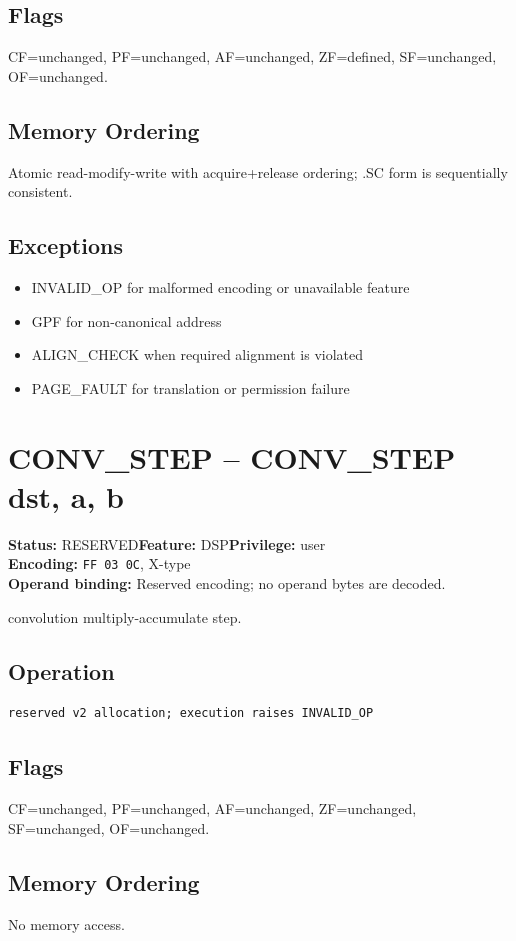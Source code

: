 \documentclass[10pt]{article}
\begin{document}
\subsection*{Flags}
CF=unchanged, PF=unchanged, AF=unchanged, ZF=defined, SF=unchanged, OF=unchanged.
\subsection*{Memory Ordering}
Atomic read-modify-write with acquire+release ordering; .SC form is sequentially consistent.
\subsection*{Exceptions}
\begin{itemize}
\item INVALID\_OP for malformed encoding or unavailable feature
\item GPF for non-canonical address
\item ALIGN\_CHECK when required alignment is violated
\item PAGE\_FAULT for translation or permission failure
\end{itemize}
\clearpage

\section{CONV\_STEP -- CONV\_STEP dst, a, b}
\textbf{Status:} RESERVED\quad \textbf{Feature:} DSP\quad \textbf{Privilege:} user\\
\textbf{Encoding:} \texttt{FF 03 0C}, X-type\\
\textbf{Operand binding:} Reserved encoding; no operand bytes are decoded.

convolution multiply-accumulate step.

\subsection*{Operation}
\begin{lstlisting}
reserved v2 allocation; execution raises INVALID_OP
\end{lstlisting}
\subsection*{Flags}
CF=unchanged, PF=unchanged, AF=unchanged, ZF=unchanged, SF=unchanged, OF=unchanged.
\subsection*{Memory Ordering}
No memory access.
\end{document}
